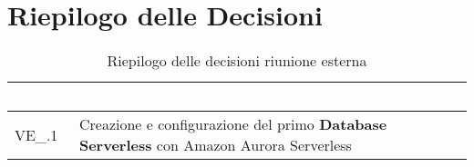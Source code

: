 \section{Riepilogo delle Decisioni}


\begin{table}[!htbp]
\renewcommand{\arraystretch}{1.5}
\begin{tabular}{m{}<{\centering}  m{}<{\centering}}
\rowcolor{darkblue} \textcolor{white}{\textbf{Codice}} & \textcolor{white}{\textbf{Decisione}} \\
\hline
VE\_\D{}.1 & Creazione e configurazione del primo \textbf{Database Serverless} con Amazon Aurora Serverless\\

\end{tabular}
\caption{Riepilogo delle decisioni riunione esterna \D{}}
\end{table}